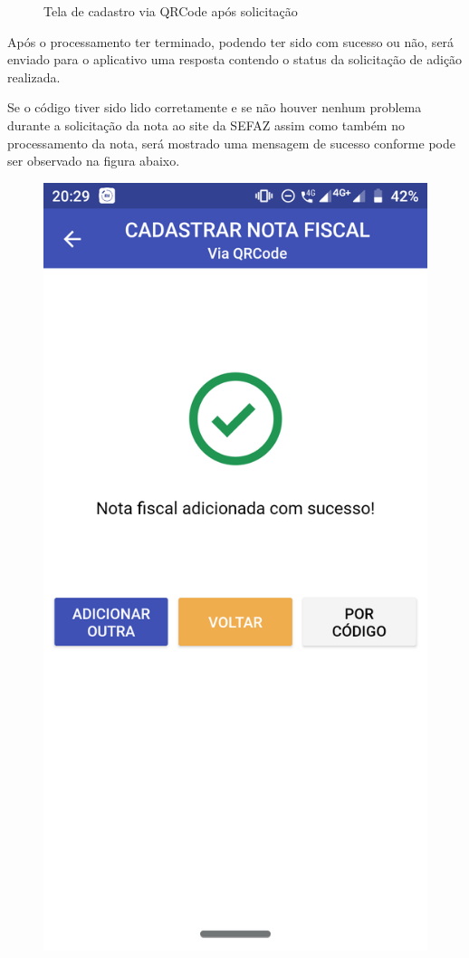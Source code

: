 \begin{figure}[h]
    \caption{Tela de cadastro via QRCode após solicitação}
    \label{appQRCodeSolicitacaoFig}
\end{figure}

\newpage
Após o processamento ter terminado, podendo ter sido com sucesso ou não, será enviado para o aplicativo uma resposta contendo o status da solicitação de adição realizada.

Se o código tiver sido lido corretamente e se não houver nenhum problema durante a solicitação da nota ao site da SEFAZ assim como também no processamento da nota, será mostrado uma mensagem de sucesso conforme pode ser observado na figura abaixo.

\begin{figure}[h]
    \centering
    \includegraphics[scale=0.15]{tcc/figures/app/app_codigo_qrcode_sucesso.png}

\end{figure}
